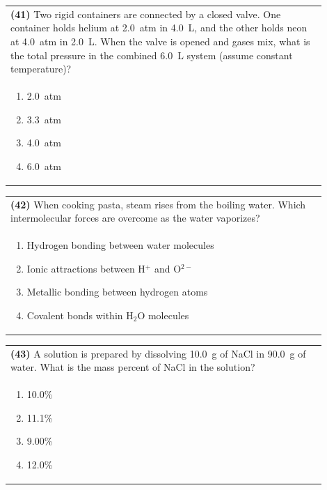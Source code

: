 \documentclass{article}
\begin{document}
{{\vspace{0.2cm}
\noindent\begin{tabular}{|p{0.9\linewidth}|}
\hline
\textbf{(41)} Two rigid containers are connected by a closed valve. One container holds helium at 2.0~atm in 4.0~L, and the other holds neon at 4.0~atm in 2.0~L. When the valve is opened and gases mix, what is the total pressure in the combined 6.0~L system (assume constant temperature)?\\[0.2cm]
\begin{minipage}[t]{0.85\linewidth}
\begin{enumerate}[label=\alph*.]
\item 2.0~atm
\item 3.3~atm
\item 4.0~atm
\item 6.0~atm
\end{enumerate}
\end{minipage}\\[0.2cm]
\hline
\end{tabular}

\vspace{0.2cm}
\noindent\begin{tabular}{|p{0.9\linewidth}|}
\hline
\textbf{(42)} When cooking pasta, steam rises from the boiling water. Which intermolecular forces are overcome as the water vaporizes?\\[0.2cm]
\begin{minipage}[t]{0.85\linewidth}
\begin{enumerate}[label=\alph*.]
\item Hydrogen bonding between water molecules
\item Ionic attractions between H$^+$ and O$^{2-}$
\item Metallic bonding between hydrogen atoms
\item Covalent bonds within H$_2$O molecules
\end{enumerate}
\end{minipage}\\[0.2cm]
\hline
\end{tabular}

\noindent\begin{tabular}{|p{0.9\linewidth}|}
\hline
\textbf{(43)} A solution is prepared by dissolving 10.0~g of NaCl in 90.0~g of water. What is the mass percent of NaCl in the solution?\\[0.2cm]
\begin{minipage}[t]{0.85\linewidth}
\begin{enumerate}[label=\alph*.]
\item 10.0\%
\item 11.1\%
\item 9.00\%
\item 12.0\%
\end{enumerate}
\end{minipage}\\[0.2cm]
\hline
\end{tabular}

}}
\end{document}
